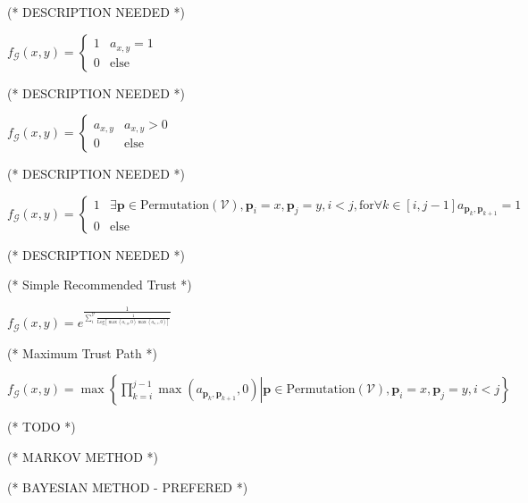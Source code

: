 \documentclass{article}
\begin{document}



(* DESCRIPTION NEEDED *)

\(f_{\mathcal{G}}(x,y)=\begin{cases}
 1 & a_{x,y}=1 \\
 0 & \text{else}
\end{cases}\)





(* DESCRIPTION NEEDED *)

\(f_{\mathcal{G}}(x,y)=\begin{cases}
 a_{x,y} & a_{x,y}>0 \\
 0 & \text{else}
\end{cases}\)





(* DESCRIPTION NEEDED *)

\(f_{\mathcal{G}}(x,y)=\begin{cases}
 1 & \exists \pmb{p}\in \text{Permutation}(\mathcal{V}),\pmb{p}_i=x,\pmb{p}_j=y,i<j,\text{for} \forall k\in [i,j-1] a_{\pmb{p}_k,\pmb{p}_{k+1}}=1
\\
 0 & \text{else}
\end{cases}\)





(* DESCRIPTION NEEDED *)



(* Simple Recommended Trust *)

\(f_{\mathcal{G}}(x,y)=e^{\frac{1}{\sum _i^{\mathcal{V}} \frac{1}{\text{Log}\left[\max \left(a_{i,y},0\right) \max \left(a_{x,i},0\right)\right]}}}\)



(* Maximum Trust Path *)

\(f_{\mathcal{G}}(x,y)=\max \left\{\left.\prod _{k=i}^{j-1} \max \left(a_{\pmb{p}_k,\pmb{p}_{k+1}},0\right)\right|\pmb{p}\in \text{Permutation}(\mathcal{V}),\pmb{p}_i=x,\pmb{p}_j=y,i<j\right\}\)



(* TODO *)



(* MARKOV METHOD *)



(* BAYESIAN METHOD - PREFERED *)
\end{document}
